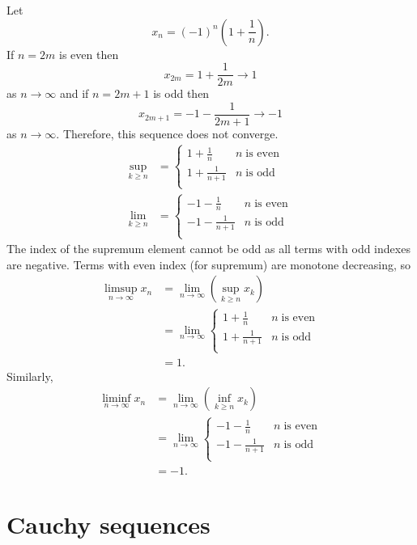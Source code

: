 \begin{example}
    Let \[x_n=(-1)^n\left(1+\frac1n\right).\] If $n=2m$ is even then \[x_{2m}=1+\frac1{2m}\to1\] as $n\to\infty$ and if $n=2m+1$ is odd then \[x_{2m+1}=-1-\frac1{2m+1}\to-1\] as $n\to\infty$. Therefore, this sequence does not converge.
    \begin{align*}
        \sup_{k\geq n}&=
        \begin{cases}
            1+\frac1n&n\;\text{is even}\\
            1+\frac1{n+1}&n\;\text{is odd}\\
        \end{cases}
        \\
        \lim_{k\geq n}&=
        \begin{cases}
            -1-\frac1n&n\;\text{is even}\\
            -1-\frac1{n+1}&n\;\text{is odd}\\
        \end{cases}
    \end{align*}
    The index of the supremum element cannot be odd as all terms with odd indexes are negative. Terms with even index (for supremum) are monotone decreasing, so
    \begin{align*}
        \limsup_{n\to\infty}x_n&=\lim_{n\to\infty}\left(\sup_{k\geq n}x_k\right)\\
        &=\lim_{n\to\infty}
        \begin{cases}
            1+\frac1n&n\;\text{is even}\\
            1+\frac1{n+1}&n\;\text{is odd}\\
        \end{cases}\\
        &=1.
    \end{align*}
    Similarly, 
    \begin{align*}
        \liminf_{n\to\infty}x_n&=\lim_{n\to\infty}\left(\inf_{k\geq n}x_k\right)\\
        &=\lim_{n\to\infty}
        \begin{cases}
            -1-\frac1n&n\;\text{is even}\\
            -1-\frac1{n+1}&n\;\text{is odd}\\
        \end{cases}\\
        &=-1.
    \end{align*}
\end{example}

\section{Cauchy sequences}

